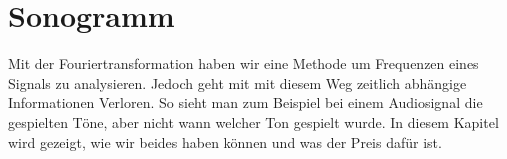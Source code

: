 %
%
%
%
\chapter{Sonogramm\label{chapter:sonogramm}}
\begin{refsection}

Mit der Fouriertransformation haben wir eine Methode um Frequenzen eines Signals zu analysieren.
Jedoch geht mit mit diesem Weg zeitlich abhängige Informationen Verloren.
So sieht man zum Beispiel bei einem Audiosignal die gespielten Töne, aber nicht wann welcher Ton gespielt wurde.
In diesem Kapitel wird gezeigt, wie wir beides haben können und was der Preis dafür ist.







\printbibliography[heading=subbibliography]
\end{refsection}

